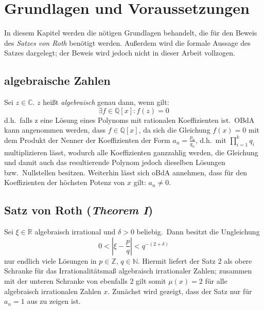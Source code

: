 
\section{Grundlagen und Voraussetzungen}
    \label{sec:basics}
    \textrm{In diesem Kapitel werden die nötigen Grundlagen behandelt, die für den Beweis des \emph{Satzes von Roth}
    benötigt werden. Außerdem wird die formale Aussage des Satzes dargelegt; der Beweis wird jedoch nicht in dieser
    Arbeit vollzogen.}
    
    \subsection{algebraische Zahlen}
        \label{subsec:algebraic-numbers}
        \textrm{Sei $z \in \mathbb{C}$. $z$ heißt \emph{algebraisch} genau dann, wenn gilt:}
        \begin{equation}
            \exists f \in \mathbb{Q}[x] : f(z) = 0 \label{eq:def-algebraic}
        \end{equation}
        \textrm{d.h.\ falls z eine Lösung eines Polynoms mit rationalen Koeffizienten ist.\ OBdA kann angenommen
        werden, dass $f \in \mathbb{Q}[x]$, da sich die Gleichung $f(x) = 0$ mit dem Produkt der Nenner der
        Koeffizienten der Form $a_n = \frac{p_n}{q_n}$, d.h.\ mit $\prod_{i=1}^k q_i$ multiplizieren lässt, wodurch
        alle Koeffizienten ganzzahlig werden, die Gleichung und damit auch das resultierende Polynom jedoch dieselben
        Lösungen bzw.\ Nullstellen besitzen.
        \newline
        Weiterhin lässt sich oBdA annehmen, dass für den Koeffizienten der höchsten Potenz von $x$ gilt: $a_n \neq 0$.}
    
    \subsection{Satz von Roth (\emph{Theorem I})}
        \label{subsec:th1}
        Sei $\xi \in \mathbb{R}$ algebraisch irrational und $\delta > 0$ beliebig.\ Dann besitzt die Ungleichung
        \begin{equation}
            0 < \left| \xi - \frac{p}{q} \right| < q^{-(2+\delta)} \label{eq:svr}
        \end{equation}
        \textrm{nur endlich viele Lösungen in $p \in \mathbb{Z}$, $q \in \mathbb{N}$.
        \newline
        \textrm{Hiermit liefert der Satz $2$ als obere Schranke für das Irrationalitätsmaß algebraisch irrationaler
        Zahlen; zusammen mit der unteren Schranke von ebenfalls $2$ gilt somit $\mu(x) = 2$ für alle algebraisch
        irrationalen Zahlen $x$.}
        \newline \newline
        Zunächst wird gezeigt, dass der Satz nur für $a_n = 1$ aus  zu zeigen ist.}
    
